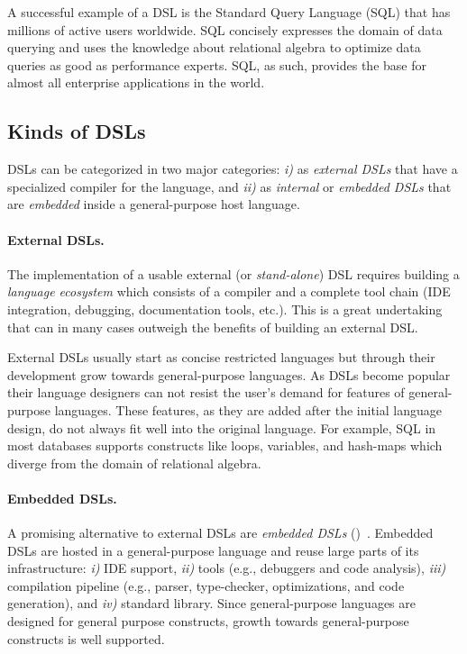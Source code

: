 A successful example of a DSL is the Standard Query Language (SQL) that has millions of active
 users worldwide. SQL concisely expresses the domain of data querying and uses
 the knowledge about relational algebra to optimize data queries as good as performance experts.
 SQL, as such, provides the base for almost all enterprise applications in the world.

\subsection{Kinds of DSLs}
\label{sec:kinds-of-dsls}

DSLs can be categorized in two major categories: \emph{i)} as \emph{external DSLs} that
 have a specialized compiler for the language, and \emph{ii)} as \emph{internal} or \emph{embedded DSLs}
 that are \emph{embedded} inside a general-purpose host language.

\paragraph{External DSLs.} The implementation of a usable external (or \emph{stand-alone})
 DSL requires building a \emph{language ecosystem} which consists of a compiler and a complete
 tool chain (IDE integration, debugging, documentation tools, etc.). This is a great
 undertaking that can in many cases outweigh the benefits of building an external DSL.


External DSLs usually start as concise restricted languages but through their development
 grow towards general-purpose languages. As DSLs become popular their language designers
 can not resist the user's demand for features of general-purpose languages.
 These features, as they are added after the initial language design, do not always fit
 well into the original language. For example, SQL in most databases supports constructs
 like loops, variables, and hash-maps which diverge from the domain of relational algebra.

\paragraph{Embedded DSLs.} A promising alternative to external DSLs are
 \emph{embedded DSLs} (\edsls)~\cite{Hudak96csur}. Embedded DSLs are hosted in a
 general-purpose language and reuse large parts of its infrastructure:
 \emph{i)} IDE support, \emph{ii)} tools (e.g., debuggers and code analysis),
 \emph{iii)} compilation pipeline (e.g., parser, type-checker, optimizations, and code generation),
 and \emph{iv)} standard library. Since general-purpose languages are designed for general
 purpose constructs, growth towards general-purpose constructs is well supported.


